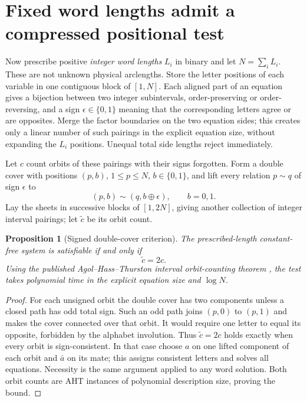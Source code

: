 \documentclass[11pt]{article}
\newtheorem{proposition}{Proposition}
\begin{document}
\section{Fixed word lengths admit a compressed positional test}

Now prescribe positive \emph{integer word lengths} $L_i$ in binary and let
$N=\sum_i L_i$. These are not unknown physical arclengths. Store the letter
positions of each variable in one contiguous block of $[1,N]$.
Each aligned part of an equation gives a bijection between two integer
subintervals, order-preserving or order-reversing, and a sign
$\epsilon\in\{0,1\}$ meaning that the corresponding letters agree or are
opposites. Merge the factor boundaries on the two equation sides; this creates
only a linear number of such pairings in the explicit equation size, without
expanding the $L_i$ positions. Unequal total side lengths reject immediately.

Let $c$ count orbits of these pairings with their signs forgotten. Form a
double cover with positions $(p,b)$, $1\leq p\leq N$, $b\in\{0,1\}$,
and lift every relation $p\sim q$ of sign $\epsilon$ to
\[
 (p,b)\sim(q,b\mathbin{\oplus}\epsilon),\qquad b=0,1.
\]
Lay the sheets in successive blocks of $[1,2N]$, giving another collection
of integer interval pairings; let $\widetilde c$ be its orbit count.

\begin{proposition}[Signed double-cover criterion]\label{prop:cover}
The prescribed-length constant-free system is satisfiable if and only if
\[
 \widetilde c=2c.
\]
Using the published Agol--Hass--Thurston interval orbit-counting theorem
\cite[Theorem 12]{AHT}, the test takes polynomial time in the explicit
equation size and $\log N$.
\end{proposition}

\begin{proof}
For each unsigned orbit the double cover has two components unless a closed
path has odd total sign. Such an odd path joins $(p,0)$ to $(p,1)$ and makes
the cover connected over that orbit. It would require one letter to equal its
opposite, forbidden by the alphabet involution. Thus $\widetilde c=2c$
holds exactly when every orbit is sign-consistent. In that case choose $a$
on one lifted component of each orbit and $\bar a$ on its mate; this assigns
consistent letters and solves all equations. Necessity is the same argument
applied to any word solution. Both orbit counts are AHT instances of polynomial
description size, proving the bound.
\end{proof}
\end{document}
